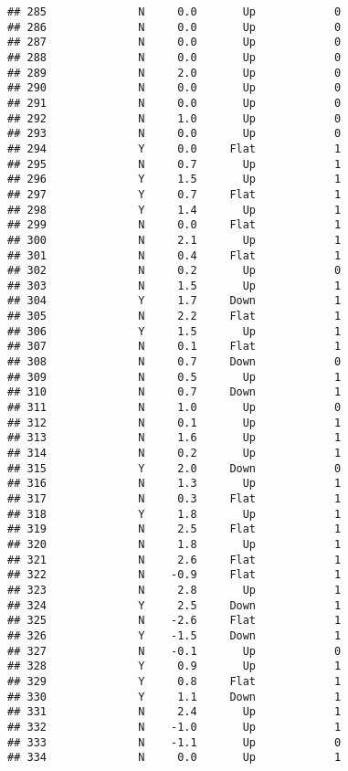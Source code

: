 \documentclass[
]{article}
\begin{document}
\begin{verbatim}
## 285              N     0.0       Up            0
## 286              N     0.0       Up            0
## 287              N     0.0       Up            0
## 288              N     0.0       Up            0
## 289              N     2.0       Up            0
## 290              N     0.0       Up            0
## 291              N     0.0       Up            0
## 292              N     1.0       Up            0
## 293              N     0.0       Up            0
## 294              Y     0.0     Flat            1
## 295              N     0.7       Up            1
## 296              Y     1.5       Up            1
## 297              Y     0.7     Flat            1
## 298              Y     1.4       Up            1
## 299              N     0.0     Flat            1
## 300              N     2.1       Up            1
## 301              N     0.4     Flat            1
## 302              N     0.2       Up            0
## 303              N     1.5       Up            1
## 304              Y     1.7     Down            1
## 305              N     2.2     Flat            1
## 306              Y     1.5       Up            1
## 307              N     0.1     Flat            1
## 308              N     0.7     Down            0
## 309              N     0.5       Up            1
## 310              N     0.7     Down            1
## 311              N     1.0       Up            0
## 312              N     0.1       Up            1
## 313              N     1.6       Up            1
## 314              N     0.2       Up            1
## 315              Y     2.0     Down            0
## 316              N     1.3       Up            1
## 317              N     0.3     Flat            1
## 318              Y     1.8       Up            1
## 319              N     2.5     Flat            1
## 320              N     1.8       Up            1
## 321              N     2.6     Flat            1
## 322              N    -0.9     Flat            1
## 323              N     2.8       Up            1
## 324              Y     2.5     Down            1
## 325              N    -2.6     Flat            1
## 326              Y    -1.5     Down            1
## 327              N    -0.1       Up            0
## 328              Y     0.9       Up            1
## 329              Y     0.8     Flat            1
## 330              Y     1.1     Down            1
## 331              N     2.4       Up            1
## 332              N    -1.0       Up            1
## 333              N    -1.1       Up            0
## 334              N     0.0       Up            1

\end{verbatim}
\end{document}
